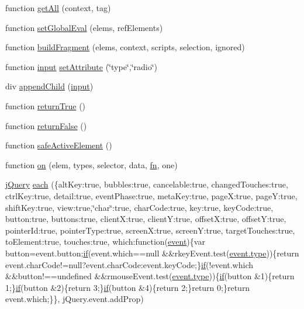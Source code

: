 \begin{DoxyCompactItemize}
\item 
function \hyperlink{jquery-3_82_81_8js_a70cf34f8c1021062b0b9e8a2f5b0629b}{get\+All} (context, tag)
\item 
function \hyperlink{jquery-3_82_81_8js_a105bee78729acf37d181cd39694745fc}{set\+Global\+Eval} (elems, ref\+Elements)
\item 
function \hyperlink{jquery-3_82_81_8js_a2e7bd626da7d1f83e42b77971e3f19f6}{build\+Fragment} (elems, context, scripts, selection, ignored)
\item 
function \hyperlink{jquery-3_82_81_8js_a877535c3b6ffdf230bce90c82c597d17}{input} \hyperlink{jquery-3_82_81_8js_af3af541890c43e7e4e733e242ae7e530}{set\+Attribute} (\char`\"{}type\char`\"{},\char`\"{}radio\char`\"{})
\item 
div \hyperlink{jquery-3_82_81_8js_a788a39803777a0f747f4be364b59be9d}{append\+Child} (\hyperlink{jquery-3_82_81_8js_a877535c3b6ffdf230bce90c82c597d17}{input})
\item 
function \hyperlink{jquery-3_82_81_8js_a7cb5178bd593771b6f8781fb770579d1}{return\+True} ()
\item 
function \hyperlink{jquery-3_82_81_8js_a58a4255fecbd8c8ab5c368b863d8fb85}{return\+False} ()
\item 
function \hyperlink{jquery-3_82_81_8js_aae881fa5740bce1cab249addd66d4474}{safe\+Active\+Element} ()
\item 
function \hyperlink{jquery-3_82_81_8js_a3d6a7b0a44ec72f81c22635b3449282e}{on} (elem, types, selector, data, \hyperlink{jquery-3_82_81_8js_acef6bdaf6b9b20fdcca1ea86f0902c3b}{fn}, one)
\item 
\hyperlink{jquery-3_82_81_8js_a609525712f1102566c2b03866ceb2bba}{j\+Query} \hyperlink{jquery-3_82_81_8js_a6fa2349258da2671deb640c4e9b66847}{each} (\{alt\+Key\+:true, bubbles\+:true, cancelable\+:true, changed\+Touches\+:true, ctrl\+Key\+:true, detail\+:true, event\+Phase\+:true, meta\+Key\+:true, page\+X\+:true, page\+Y\+:true, shift\+Key\+:true, view\+:true,\char`\"{}char\char`\"{}\+:true, char\+Code\+:true, key\+:true, key\+Code\+:true, button\+:true, buttons\+:true, client\+X\+:true, client\+Y\+:true, offset\+X\+:true, offset\+Y\+:true, pointer\+Id\+:true, pointer\+Type\+:true, screen\+X\+:true, screen\+Y\+:true, target\+Touches\+:true, to\+Element\+:true, touches\+:true, which\+:function(\hyperlink{jquery-3_82_81_8js_a2ece9eec3df1cd48d8203e336e83563e}{event})\{var button=event.\+button;\hyperlink{jquery-3_82_81_8js_ad6cbdd9e1fadb4d9540fff933cdd6fdc}{if}(event.\+which==null \&\&rkey\+Event.\+test(\hyperlink{jquery-3_82_81_8js_a4c4533b7d49de290bb8cccd4e6f43349}{event.\+type}))\{return event.\+char\+Code!=null?event.\+char\+Code\+:event.\+key\+Code;\}\hyperlink{jquery-3_82_81_8js_ad6cbdd9e1fadb4d9540fff933cdd6fdc}{if}(!event.\+which \&\&button!==undefined \&\&rmouse\+Event.\+test(\hyperlink{jquery-3_82_81_8js_a4c4533b7d49de290bb8cccd4e6f43349}{event.\+type}))\{\hyperlink{jquery-3_82_81_8js_ad6cbdd9e1fadb4d9540fff933cdd6fdc}{if}(button \&1)\{return 1;\}\hyperlink{jquery-3_82_81_8js_ad6cbdd9e1fadb4d9540fff933cdd6fdc}{if}(button \&2)\{return 3;\}\hyperlink{jquery-3_82_81_8js_ad6cbdd9e1fadb4d9540fff933cdd6fdc}{if}(button \&4)\{return 2;\}return 0;\}return event.\+which;\}\}, j\+Query.\+event.\+add\+Prop)

\end{DoxyCompactItemize}
